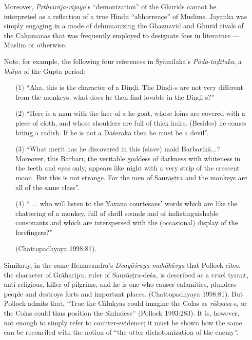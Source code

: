Moreover, {\sl Pṛthvīrāja-vijaya}’s “demonization” of the Ghurids cannot be interpreted as a reflection of a true Hindu “abhorrence” of Muslims. Jayāṅka was simply engaging in a mode of dehumanizing the Ghaznavid and Ghurid rivals of the Cāhamānas that was frequently employed to designate foes in literature — Muslim or otherwise. 

Note, for example, the following four references in Śyāmilaka’s {\sl Pāda-tāḍitaka}, a {\sl bhāṇa} of the Gupta period: 
\begin{itemize}
\item[(1)] “Aha, this is the character of a Diṇḍi. The Diṇḍi-s are not very different from the monkeys, what does he then find lovable in the Diṇḍi-s?”

\item[(2)] “Here is a man with the face of a he-goat, whose loins are covered with a piece of cloth, and whose shoulders are full of thick hairs. (Besides) he comes biting a radish. If he is not a Dāśeraka then he must be a devil”. 

\item[(3)] “What merit has he discovered in this (slave) maid Barbarikā...? Moreover, this Barbarī, the veritable goddess of darkness with whiteness in the teeth and eyes only, appears like night with a very strip of the crescent moon. But this is not strange. For the men of Saurāṣṭra and the monkeys are all of the same class”. 

\item[(4)] “ ... who will listen to the Yavana courtesans’ words which are like the chattering of a monkey, full of shrill sounds and of indistinguishable consonants and which are interspersed with the (occasional) display of the forefingers?” 

\hfill (Chattopadhyaya 1998:81). 
\end{itemize}

Similarly, in the same Hemacandra’s {\sl Dvayāśraya mahākāvya} that Pollock cites, the character of Grāharipu, ruler of Saurāṣṭra-deśa, is described as a cruel tyrant, anti-religious, killer of pilgrims, and he is one who causes calamities, plunders people and destroys forts and important places. (Chattopadhyaya 1998:81). But Pollock admits that, “True the Cālukyas could imagine the Colas as {\sl rākṣasa}-s, or the Colas could thus position the Sinhalese” (Pollock 1993:283). It is, however, not enough to simply refer to counter-evidence; it must be shown how the same can be reconciled with the notion of “the utter dichotomization of the enemy”. 


